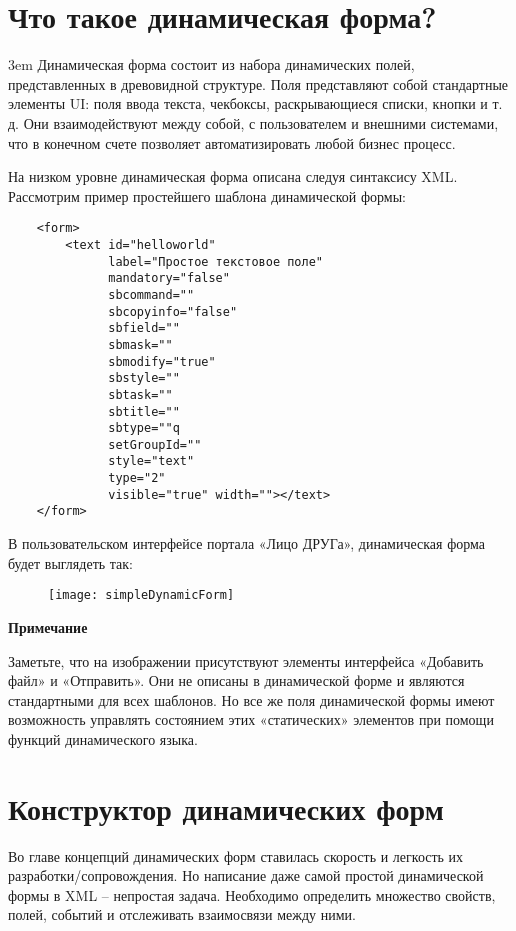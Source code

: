 \documentclass[../index.tex]{subfiles}
\begin{document}
\section{Что такое динамическая форма?}
\emergencystretch 3em
Динамическая форма состоит из набора динамических полей, представленных в древовидной структуре.
Поля представляют собой стандартные элементы UI: поля ввода текста, чекбоксы, раскрывающиеся списки, кнопки и т. д.
Они взаимодействуют между собой, с пользователем и внешними системами,
что в конечном счете позволяет автоматизировать любой бизнес процесс.

На низком уровне динамическая форма описана следуя синтаксису XML.
Рассмотрим пример простейшего шаблона динамической формы:
\begin{verbatim}
    <form>
        <text id="helloworld"
              label="Простое текстовое поле"
              mandatory="false"
              sbcommand=""
              sbcopyinfo="false"
              sbfield=""
              sbmask=""
              sbmodify="true"
              sbstyle=""
              sbtask=""
              sbtitle=""
              sbtype=""q
              setGroupId=""
              style="text"
              type="2"
              visible="true" width=""></text>
    </form>
\end{verbatim}

В пользовательском интерфейсе портала «Лицо ДРУГа», динамическая форма будет выглядеть так:

\begin{figure}[h]
    \texttt{[image: simpleDynamicForm]}
    \centering
\end{figure}

\textbf{Примечание}

Заметьте, что на изображении присутствуют элементы интерфейса «Добавить файл» и «Отправить».
Они не описаны в динамической форме и являются стандартными для всех шаблонов.
Но все же поля динамической формы имеют возможность управлять состоянием этих «статических» элементов
при помощи функций динамического языка.

\section{Конструктор динамических форм}
Во главе концепций динамических форм ставилась скорость и легкость их разработки/сопровождения.
Но написание даже самой простой динамической формы в XML – непростая задача.
Необходимо определить множество свойств, полей, событий и отслеживать взаимосвязи между ними.
\end{document}
